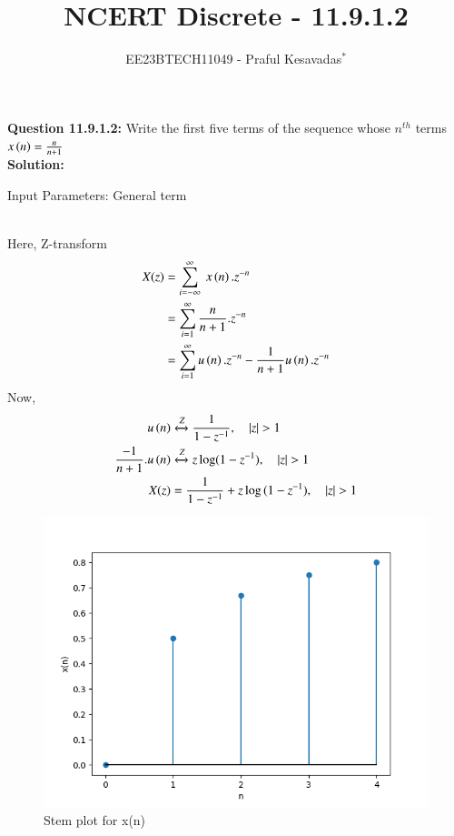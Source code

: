 \documentclass[journal,12pt,twocolumn]{IEEEtran}
\theoremstyle{remark}
\begin{document}

\vspace{3cm}

\title{NCERT Discrete - 11.9.1.2}
\author{EE23BTECH11049 - Praful Kesavadas$^{*}$%
}
\maketitle
\newpage
\bigskip

\renewcommand{\thefigure}{\theenumi}
\renewcommand{\thetable}{\theenumi}
\textbf{Question 11.9.1.2:}
Write the first five terms of the sequence whose $n^{th}$ terms  $x\left(n\right) = \frac{n}{n+1}$\\
\textbf{Solution:}
\begin{table}[ht]
  \centering
  
  \caption{Input Parameters: General term}
\end{table}\\
Here, Z-transform
\begin{align}
X(z) &= \sum_{i=-\infty}^\infty\ x\left(n\right).z^{-n}\\
&= \sum_{i=1}^\infty \frac{n}{n+1} . z^{-n}\\
&= \sum_{i=1}^\infty u\left(n\right).z^{-n} - \frac{1}{n+1} u\left(n\right).z^{-n}
\end{align}
Now, 
\begin{align}
u\brak{n} &\xleftrightarrow Z  \frac{1}{1-z^{-1}}, \quad{|z|>1}\\
\frac{-1}{n+1}.u\brak{n} &\xleftrightarrow Z  z\log(1-z^{-1}), \quad{|z|>1}\\
X(z) &= \frac{1}{1-z^{-1}} + z\log{(1-z^{-1})} ,\quad{|z|>1}
\end{align}
\begin{figure}
    \centering
    \includegraphics[width=\columnwidth]{figs/graph1.png}
    \caption{Stem plot for x(n)}
    \label{fig:11.9.1.2fig1}
\end{figure}
\end{document}
